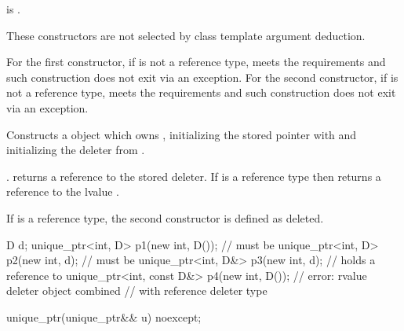 \begin{itemdescr}
\pnum
\constraints
{} is .

\pnum
\mandates
These constructors are not selected by
class template argument deduction.

\pnum
\expects
For the first constructor, if  is not a reference type,
 meets the  requirements and
such construction does not exit via an exception.
For the second constructor, if  is not a reference type,
 meets the  requirements and
such construction does not exit via an exception.

\pnum
\effects
Constructs a  object which owns , initializing
the stored pointer with  and initializing the deleter
from .

\pnum
\ensures
{}.
 returns a reference to the stored
deleter. If  is a reference type then 
returns a reference to the lvalue .

\pnum
\remarks
If  is a reference type,
the second constructor is defined as deleted.

\pnum
\begin{example}
\begin{codeblock}
D d;
unique_ptr<int, D> p1(new int, D());        //  must be 
unique_ptr<int, D> p2(new int, d);          //  must be 
unique_ptr<int, D&> p3(new int, d);         //  holds a reference to 
unique_ptr<int, const D&> p4(new int, D()); // error: rvalue deleter object combined
                                            // with reference deleter type
\end{codeblock}
\end{example}
\end{itemdescr}

%
\begin{itemdecl}
unique_ptr(unique_ptr&& u) noexcept;
\end{itemdecl}

